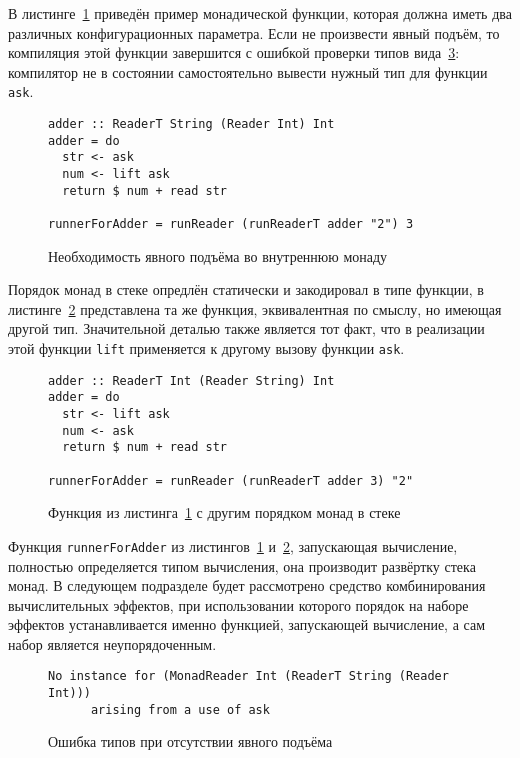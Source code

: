 В листинге~\ref{listing:mtlReadersLift} приведён пример монадической функции, которая должна иметь два различных конфигурационных параметра. Если не произвести явный подъём, то компиляция этой функции завершится с ошибкой проверки типов вида~\ref{listing:mtlCompileError}: компилятор не в состоянии самостоятельно вывести нужный тип для функции \lstinline{ask}.

\begin{figure}[t]
\begin{lstlisting}
adder :: ReaderT String (Reader Int) Int
adder = do
  str <- ask
  num <- lift ask
  return $ num + read str

runnerForAdder = runReader (runReaderT adder "2") 3
\end{lstlisting}
\caption{Необходимость явного подъёма во внутреннюю монаду}
\label{listing:mtlReadersLift}
\end{figure}

Порядок монад в стеке опредлён статически и закодировал в типе функции, в листинге~\ref{listing:mtlDifferentReadersLift} представлена та же функция, эквивалентная по смыслу, но имеющая другой тип. Значительной деталью также является тот факт, что в реализации этой функции \lstinline{lift} применяется к другому вызову функции \lstinline{ask}. 

\begin{figure}[t]
\begin{lstlisting}
adder :: ReaderT Int (Reader String) Int
adder = do
  str <- lift ask
  num <- ask
  return $ num + read str

runnerForAdder = runReader (runReaderT adder 3) "2"
\end{lstlisting}
\caption{Функция из листинга~\ref{listing:mtlReadersLift} с другим порядком монад в стеке}
\label{listing:mtlDifferentReadersLift}
\end{figure}

Функция \lstinline{runnerForAdder} из листингов~\ref{listing:mtlReadersLift} и~\ref{listing:mtlDifferentReadersLift}, запускающая вычисление, полностью определяется типом вычисления, она производит развёртку стека монад. В следующем подразделе будет рассмотрено средство комбинирования вычислительных эффектов, при использовании которого порядок на наборе эффектов устанавливается именно функцией, запускающей вычисление, а сам набор является неупорядоченным.     

\begin{figure}[t]
\begin{lstlisting}
No instance for (MonadReader Int (ReaderT String (Reader Int)))
      arising from a use of ask
\end{lstlisting}
\caption{Ошибка типов при отсутствии явного подъёма}
\label{listing:mtlCompileError}
\end{figure}

